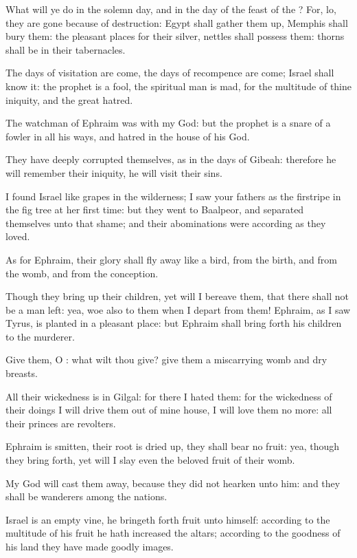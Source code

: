 \Verse What will ye do in the solemn day, and in the day of the feast of the \LORD?  \Verse For, lo, they are gone because of destruction: Egypt shall gather them up, Memphis shall bury them: the pleasant places for their silver, nettles shall possess them: thorns shall be in their tabernacles.

\Verse The days of visitation are come, the days of recompence are come; Israel shall know it: the prophet is a fool, the spiritual man is mad, for the multitude of thine iniquity, and the great hatred.

\Verse The watchman of Ephraim was with my God: but the prophet is a snare of a fowler in all his ways, and hatred in the house of his God.

\Verse They have deeply corrupted themselves, as in the days of Gibeah: therefore he will remember their iniquity, he will visit their sins.

\Verse I found Israel like grapes in the wilderness; I saw your fathers as the firstripe in the fig tree at her first time: but they went to Baalpeor, and separated themselves unto that shame; and their abominations were according as they loved.

\Verse As for Ephraim, their glory shall fly away like a bird, from the birth, and from the womb, and from the conception.

\Verse Though they bring up their children, yet will I bereave them, that there shall not be a man left: yea, woe also to them when I depart from them!  \Verse Ephraim, as I saw Tyrus, is planted in a pleasant place: but Ephraim shall bring forth his children to the murderer.

\Verse Give them, O \LORD: what wilt thou give? give them a miscarrying womb and dry breasts.

\Verse All their wickedness is in Gilgal: for there I hated them: for the wickedness of their doings I will drive them out of mine house, I will love them no more: all their princes are revolters.

\Verse Ephraim is smitten, their root is dried up, they shall bear no fruit: yea, though they bring forth, yet will I slay even the beloved fruit of their womb.

\Verse My God will cast them away, because they did not hearken unto him: and they shall be wanderers among the nations.


\Chapter
\Verse Israel is an empty vine, he bringeth forth fruit unto himself: according to the multitude of his fruit he hath increased the altars; according to the goodness of his land they have made goodly images.

